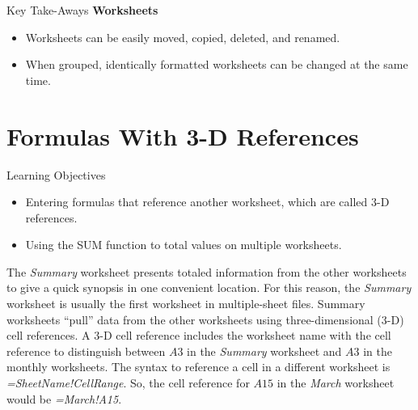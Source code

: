 \begin{center}
	\begin{tkwbox}{Key Take-Aways}
		\textbf{Worksheets}
		\\
		\begin{itemize}
			\setlength{\itemsep}{0pt}
			\setlength{\parskip}{0pt}
			\setlength{\parsep}{0pt}
			
			\item Worksheets can be easily moved, copied, deleted, and renamed.
			\item When grouped, identically formatted worksheets can be changed at the same time.
			
		\end{itemize}
	\end{tkwbox}
\end{center}

\section{Formulas With 3-D References}

\begin{center}
	\begin{objbox}{Learning Objectives}
		\begin{itemize}
			\setlength{\itemsep}{0pt}
			\setlength{\parskip}{0pt}
			\setlength{\parsep}{0pt}

			\item Entering formulas that reference another worksheet, which are called $ 3 $-D references.
			\item Using the SUM function to total values on multiple worksheets.
			
		\end{itemize}
	\end{objbox}
\end{center}

The \textit{Summary} worksheet presents totaled information from the other worksheets to give a quick synopsis in one convenient location. For this reason, the \textit{Summary} worksheet is usually the first worksheet in multiple-sheet files. Summary worksheets ``pull'' data from the other worksheets using three-dimensional ($ 3 $-D) cell references. A $ 3 $-D cell reference includes the worksheet name with the cell reference to distinguish between $ A3 $ in the \textit{Summary} worksheet and $ A3 $ in the monthly worksheets. The syntax to reference a cell in a different worksheet is \textit{=SheetName!CellRange}. So, the cell reference for $ A15 $ in the \textit{March} worksheet would be \textit{=March!A15}.


